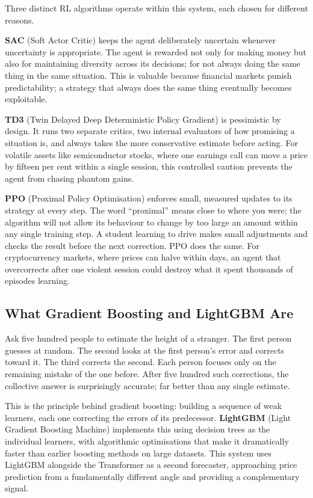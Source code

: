 \documentclass[journal]{IEEEtran}
\begin{document}
Three distinct RL algorithms operate within this system, each chosen for
different reasons.

\textbf{SAC} (Soft Actor Critic) keeps the agent deliberately uncertain
whenever uncertainty is appropriate. The agent is rewarded not only for
making money but also for maintaining diversity across its decisions; for
not always doing the same thing in the same situation. This is valuable
because financial markets punish predictability; a strategy that always
does the same thing eventually becomes exploitable.

\textbf{TD3} (Twin Delayed Deep Deterministic Policy Gradient) is
pessimistic by design. It runs two separate critics, two internal
evaluators of how promising a situation is, and always takes the more
conservative estimate before acting. For volatile assets like
semiconductor stocks, where one earnings call can move a price by fifteen
per cent within a single session, this controlled caution prevents the
agent from chasing phantom gains.

\textbf{PPO} (Proximal Policy Optimisation) enforces small, measured
updates to its strategy at every step. The word ``proximal'' means close
to where you were; the algorithm will not allow its behaviour to change
by too large an amount within any single training step. A student learning
to drive makes small adjustments and checks the result before the next
correction. PPO does the same. For cryptocurrency markets, where prices
can halve within days, an agent that overcorrects after one violent
session could destroy what it spent thousands of episodes learning.

\subsection{What Gradient Boosting and LightGBM Are}

Ask five hundred people to estimate the height of a stranger. The first
person guesses at random. The second looks at the first person's error and
corrects toward it. The third corrects the second. Each person focuses
only on the remaining mistake of the one before. After five hundred such
corrections, the collective answer is surprisingly accurate; far better
than any single estimate.

This is the principle behind gradient boosting: building a sequence of
weak learners, each one correcting the errors of its predecessor.
\textbf{LightGBM} (Light Gradient Boosting Machine) implements this
using decision trees as the individual learners, with algorithmic
optimisations that make it dramatically faster than earlier boosting
methods on large datasets. This system uses LightGBM alongside the
Transformer as a second forecaster, approaching price prediction from a
fundamentally different angle and providing a complementary signal.
\end{document}
